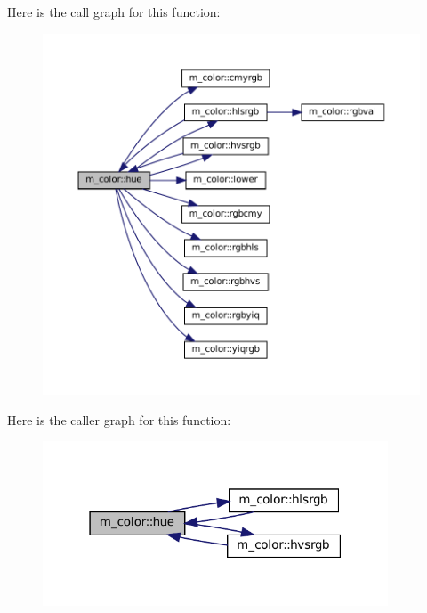 Here is the call graph for this function\+:\nopagebreak
\begin{figure}[H]
\begin{center}
\leavevmode
\includegraphics[width=350pt]{namespacem__color_a56dd07bbf1378ccc78a230d171f9d429_cgraph}
\end{center}
\end{figure}
Here is the caller graph for this function\+:\nopagebreak
\begin{figure}[H]
\begin{center}
\leavevmode
\includegraphics[width=291pt]{namespacem__color_a56dd07bbf1378ccc78a230d171f9d429_icgraph}
\end{center}
\end{figure}
\mbox{\label{namespacem__color_a334ec90d94bbfb9a4c08c5f9efdb8c47}} 
